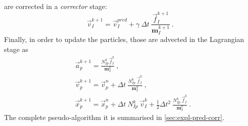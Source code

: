 \documentclass[preprint,12pt,a4paper]{elsarticle}
\newcommand{\tens}[1]{
  \ensuremath{\mathbf{{#1}}}
}
\begin{document}
are corrected in a \textit{corrector} stage:
\begin{equation}
  \label{eq:Corrector-velocity}
  \vec{v}_{I}^{k+1} = \vec{v}_{I}^{pred} + \gamma\ \Delta t\
  \frac{\vec{f}_{I}^{k+1}}{\tens{m}_I^{k+1}}\ .
\end{equation}
Finally, in order to update the particles, those are advected in the Lagrangian stage as
\begin{align}
  \label{eq:Update-lagrangian-pce}
        &\vec{a}_p^{k+1} =
          \frac{N_{Ip}^k\vec{f}_{I}^{k}}{\tens{m}_I^k}\ ,\\
      &\vec{v}_p^{k+1} = \vec{v}_p^n + \Delta t\
        \frac{N_{Ip}^k\
        \vec{f}_{I}^{k}}{\tens{m}_I^k}\ ,\\
      &\vec{x}_p^{k+1} = \vec{x}_p^n + \Delta t\
         N_{Ip}^k\ \vec{v}_{I}^{k} +
        \frac{1}{2}\Delta t^2\ \frac{N_{Ip}^k\
        \vec{f}_{I}^{k}}{\tens{m}_I^k}\ .
\end{align}
The complete pseudo-algorithm it is summarised in \ref{sec:expl-pred-corr}.
\end{document}
